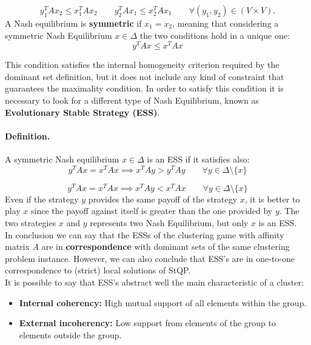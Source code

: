 $$y_1^TAx_2 \leq x_1^TAx_2 \qquad y_2^TAx_1 \leq x_2^TAx_1 \qquad \forall (y_1,y_2) \in (V\times V).$$ 
A Nash equilibrium is \textbf{symmetric} if $x_1 = x_2$, meaning that considering a symmetric Nash Equilibrium $x \in \Delta$ the two conditions hold in a unique one:
$$y^TAx \leq x^TAx$$

This condition satisfies the internal homogeneity criterion required by the dominant set definition, but it does not include any kind of constraint that guarantees the maximality condition. In order to satisfy this condition it is necessary to look for a different type of Nash Equilibrium, known as \textbf{Evolutionary Stable Strategy (ESS)}. 

\paragraph{Definition.} A symmetric Nash equilibrium $x\in \Delta$ is an ESS if it satisfies also:
$$y^TAx = x^TAx \implies x^TAy > y^TAy \qquad \forall y \in \Delta\setminus\{x\}$$

$$y^TAx = x^TAx \implies x^TAy < x^TAx \qquad \forall y \in \Delta\setminus\{x\}$$
Even if the strategy $y$ provides the same payoff of the strategy $x$, it is better to play $x$ since the payoff against itself is greater than the one provided by $y$. The two strategies $x$ and $y$ represents two Nash Equilibrium, but only $x$ is an ESS.\\
In conclusion we can say that the ESSs of the clustering game with affinity matrix $A$ are in \textbf{correspondence} with dominant sets of the same clustering problem instance. However, we can also conclude that ESS’s are in one-to-one correspondence to (strict) local solutions of StQP.\\
It is possible to say that ESS's abstract well the main characteristic of a cluster:
\begin{itemize}
	\item \textbf{Internal coherency:} High mutual support of all elements within the group.
	\item \textbf{External incoherency:} Low support from elements of the group to elements outside the group.
\end{itemize}



